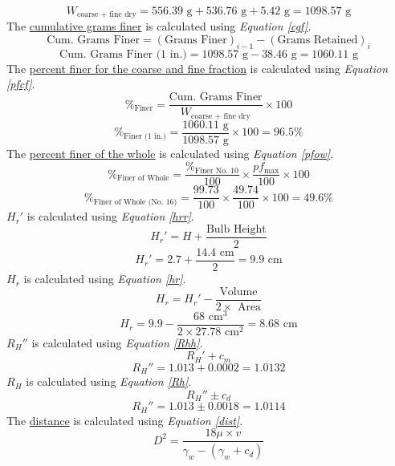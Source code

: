 \documentclass{article}
\begin{document}
\[W_\text{coarse + fine dry}=556.39\text{ g}+536.76\text{ g}+5.42\text{ g}=\boxed{ 1098.57\text{ g}}\]
\noindent The \underline{cumulative grams finer} is calculated using \emph{Equation \ref{cgf}}. 
\begin{equation}\label{cgf}\text{Cum. Grams Finer}=(\text{Grams Finer})_{i-1}-(\text{Grams Retained})_i\end{equation}
\[\text{Cum. Grams Finer (1 in.)}=1098.57\text{ g}-38.46\text{ g}=\boxed{1060.11\text{ g}}\]
\noindent The \underline{percent finer for the coarse and fine fraction} is calculated using \emph{Equation \ref{pfcf}}. 
\begin{equation}\label{pfcf}\%_\text{Finer}=\frac{\text{Cum. Grams Finer}}{W_\text{coarse + fine dry}}\times 100\end{equation}
\[\%_\text{Finer (1 in.)}=\frac{1060.11\text{ g}}{1098.57\text{ g}}\times 100=\boxed{96.5\%}\] 
\noindent The \underline{percent finer of the whole} is calculated using \emph{Equation \ref{pfow}}. 
\begin{equation}\label{pfow}\%_\text{Finer of Whole}=\frac{\%_\text{Finer No. 10}}{100}\times \frac{pf_\text{max}}{100}\times 100\end{equation}
\[\%_\text{Finer of Whole (No. 16)}=\frac{99.73}{100}\times\frac{49.74}{100}\times 100=\boxed{49.6\%}\] 
\noindent \underline{$H_r'$} is calculated using \emph{Equation \ref{hrr}}. 
\begin{equation}\label{hrr}H_r'=H+\frac{\text{Bulb Height}}{2}\end{equation}
\[H_r'=2.7+\frac{14.4\text{ cm}}{2}=\boxed{9.9\text{ cm}}\] 
\noindent \underline{$H_r$} is calculated using \emph{Equation \ref{hr}}. 
\begin{equation}\label{hr}H_r=H_r'-\frac{\text{Volume}}{2\times\text{ Area}}\end{equation}  
\[H_r=9.9-\frac{68\text{ cm}^3}{2\times 27.78\text{ cm}^2}=\boxed{8.68\text{ cm}}\]
\noindent \underline{$R_H''$} is calculated using \emph{Equation \ref{Rhh}}. 
\begin{equation}\label{Rhh}R_H'+c_m\end{equation}
\[R_H''=1.013+0.0002=\boxed{1.0132}\]
\noindent \underline{$R_H$} is calculated using \emph{Equation \ref{Rh}}. 
\begin{equation}\label{Rh}R_H''\pm c_d\end{equation}
\[R_H''=1.013\pm 0.0018=\boxed{1.0114}\]
\noindent The \underline{distance} is calculated using \emph{Equation \ref{dist}}. 
\[D^2=\frac{18\mu\times v}{\gamma_w-(\gamma_w+c_d)}\]
\end{document}
